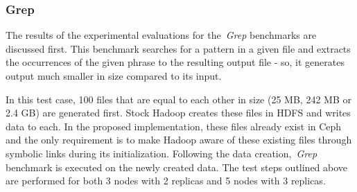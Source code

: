 \begin{table}[!htbp]
 \begin{center}
 \end{center}
 \caption{Test Parameters}
 \label{testparams}
\end{table}

\subsubsection{Grep}
\label{greptest}
The results of the experimental evaluations for the~\textit{Grep} benchmarks are discussed first.
This benchmark searches for a pattern in a given file and extracts the occurrences
of the given phrase to the resulting output file - so, it generates output much smaller
in size compared to its input.

In this test case, 100 files that are equal to each other in size (25 MB, 242 MB or 2.4 GB)
are generated first. Stock Hadoop creates these files in HDFS and writes data to each.
In the proposed implementation, these files already exist in Ceph and the only requirement
is to make Hadoop aware of these existing files through symbolic links during its initialization. 
Following the data creation,~\textit{Grep} benchmark is executed on the newly created data.
The test steps outlined above are performed for both 3 nodes with 2 replicas and 5 nodes with
3 replicas.

